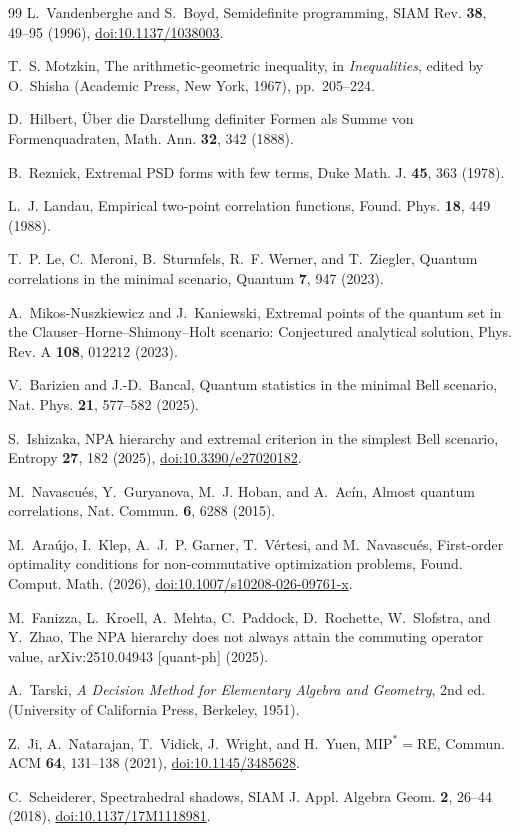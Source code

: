 \documentclass[aps,prl,onecolumn,10pt,superscriptaddress,nofootinbib,longbibliography]{revtex4-2}
\theoremstyle{remark}
\begin{document}
\begin{thebibliography}{99}
L.~Vandenberghe and S.~Boyd,
Semidefinite programming,
SIAM Rev. \textbf{38}, 49--95 (1996),
\href{https://doi.org/10.1137/1038003}{doi:10.1137/1038003}.

T.~S. Motzkin,
The arithmetic-geometric inequality, in
\emph{Inequalities}, edited by O.~Shisha
(Academic Press, New York, 1967), pp.~205--224.

D.~Hilbert,
\"Uber die Darstellung definiter Formen als Summe von Formenquadraten,
Math. Ann. \textbf{32}, 342 (1888).

B.~Reznick,
Extremal PSD forms with few terms,
Duke Math. J. \textbf{45}, 363 (1978).

L.~J. Landau,
Empirical two-point correlation functions,
Found. Phys. \textbf{18}, 449 (1988).

T.~P. Le, C.~Meroni, B.~Sturmfels, R.~F. Werner, and T.~Ziegler,
Quantum correlations in the minimal scenario,
Quantum \textbf{7}, 947 (2023).

A.~Mikos-Nuszkiewicz and J.~Kaniewski,
Extremal points of the quantum set in the Clauser--Horne--Shimony--Holt scenario: Conjectured analytical solution,
Phys. Rev. A \textbf{108}, 012212 (2023).

V.~Barizien and J.-D.~Bancal,
Quantum statistics in the minimal Bell scenario,
Nat. Phys. \textbf{21}, 577--582 (2025).

S.~Ishizaka,
NPA hierarchy and extremal criterion in the simplest Bell scenario,
Entropy \textbf{27}, 182 (2025),
\href{https://doi.org/10.3390/e27020182}{doi:10.3390/e27020182}.

M.~Navascu\'es, Y.~Guryanova, M.~J. Hoban, and A.~Ac\'in,
Almost quantum correlations,
Nat. Commun. \textbf{6}, 6288 (2015).

M.~Ara\'ujo, I.~Klep, A.~J.~P. Garner, T.~V\'ertesi, and M.~Navascu\'es,
First-order optimality conditions for non-commutative optimization problems,
Found. Comput. Math. (2026),
\href{https://doi.org/10.1007/s10208-026-09761-x}{doi:10.1007/s10208-026-09761-x}.

M.~Fanizza, L.~Kroell, A.~Mehta, C.~Paddock, D.~Rochette, W.~Slofstra, and Y.~Zhao,
The NPA hierarchy does not always attain the commuting operator value,
arXiv:2510.04943 [quant-ph] (2025).

A.~Tarski,
\emph{A Decision Method for Elementary Algebra and Geometry},
2nd ed. (University of California Press, Berkeley, 1951).

Z.~Ji, A.~Natarajan, T.~Vidick, J.~Wright, and H.~Yuen,
$\mathrm{MIP}^*=\mathrm{RE}$,
Commun. ACM \textbf{64}, 131--138 (2021),
\href{https://doi.org/10.1145/3485628}{doi:10.1145/3485628}.

C.~Scheiderer,
Spectrahedral shadows,
SIAM J. Appl. Algebra Geom. \textbf{2}, 26--44 (2018),
\href{https://doi.org/10.1137/17M1118981}{doi:10.1137/17M1118981}.

\end{thebibliography}
\end{document}
